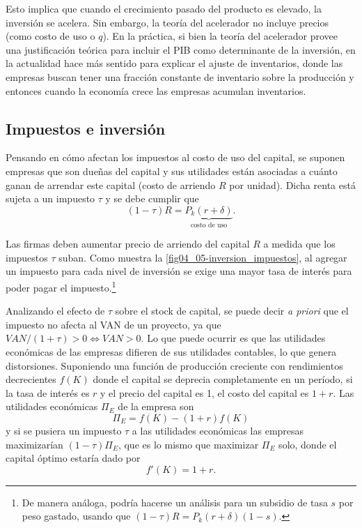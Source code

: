 \documentclass[DeGregorioResumen]{subfiles}
\begin{document}
Esto implica que cuando el crecimiento pasado del producto es elevado, la inversión se acelera. Sin embargo, la teoría del acelerador no incluye precios (como costo de uso o $q$). En la práctica, si bien la teoría del acelerador provee una justificación teórica para incluir el PIB como determinante de la inversión, en la actualidad hace más sentido para explicar el ajuste de inventarios, donde las empresas buscan tener una fracción constante de inventario sobre la producción y entonces cuando la economía crece las empresas acumulan inventarios.

\subsection{Impuestos e inversión}

Pensando en cómo afectan los impuestos al costo de uso del capital, se suponen empresas que son dueñas del capital y sus utilidades están asociadas a cuánto ganan de arrendar este capital (costo de arriendo $R$ por unidad). Dicha renta está sujeta a un impuesto $\tau$ y se debe cumplir que
\begin{equation*}
(1-\tau)R=\underbrace{P_k(r+\delta)}_{\text{costo de uso}}.
\end{equation*}

Las firmas deben aumentar precio de arriendo del capital $R$ a medida que los impuestos $\tau$ suban. Como muestra la \autoref{fig04_05-inversion_impuestos}, al agregar un impuesto para cada nivel de inversión se exige una mayor tasa de interés para poder pagar el impuesto.\footnote{De manera análoga, podría hacerse un análisis para un subsidio de tasa $s$ por peso gastado, usando que $(1-\tau)R= P_k(r+\delta)(1-s)$.}



Analizando el efecto de $\tau$ sobre el stock de capital, se puede decir \textit{a priori} que el impuesto no afecta al VAN de un proyecto, ya que $VAN/(1+\tau)>0 \iff VAN>0 $. Lo que puede ocurrir es que las utilidades económicas de las empresas difieren de sus utilidades contables, lo que genera distorsiones. Suponiendo una función de producción creciente con rendimientos decrecientes $f(K)$ donde el capital se deprecia completamente en un período, si la tasa de interés es $r$ y el precio del capital es 1, el costo del capital es $1+r$. Las utilidades económicas $\Pi_E$ de la empresa son
\begin{equation*}
\Pi_E = f(K) - (1+r)f(K)
\end{equation*}
y si se pusiera un impuesto $\tau$ a las utilidades económicas las empresas maximizarían $(1-\tau)\Pi_E$, que es lo mismo que maximizar $\Pi_E$ solo, donde el capital óptimo estaría dado por
\begin{equation}
f'(K)=1+r.
\end{equation}
 
\end{document}
